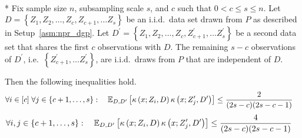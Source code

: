 \begin{lem}[]\label{lem:expec_kernel_prod_bound}\mbox{}\\*
    Fix sample size $n$, subsampling scale $s$, and $c$ such that $0 < c \leq s \leq n$.
	Let $D = \left\{Z_1, Z_2, \dotsc, Z_c, Z_{c+1}, \dotsc Z_s \right\}$ be an i.i.d.\ data set drawn from $P$ as described in Setup~\ref{asm:npr_dgp}.
	Let $D^{\prime} = \left\{Z_1, Z_2, \dotsc, Z_c, Z_{c+1}^{\prime}, \dotsc Z_s^{\prime} \right\}$ be a second data set that shares the first $c$ observations with $D$.
	The remaining $s - c$ observations of $D^{\prime}$, i.e.\ $\left\{Z_{c+1}^{\prime}, \dotsc Z_s^{\prime} \right\}$, are i.i.d.\ draws from $P$ that are independent of $D$.

    Then the following inequalities hold.
    \begin{equation}
        \begin{aligned}
            \forall i \in [c] \; \forall j \in \{c+1, \dotsc, s\}: \quad
            \mathbb{E}_{D, D^{\prime}}\left[\kappa\left(x; Z_{i}, D\right)\kappa\left(x; Z_{j}^{\prime}, D^{\prime}\right)\right]
            & \leq \frac{2}{(2s - c)(2s-c-1)}
        \end{aligned}
    \end{equation}
    \begin{equation}
        \begin{aligned}
            \forall i,j \in \{c+1, \dotsc, s\}: \quad
            \mathbb{E}_{D, D^{\prime}}\left[\kappa\left(x; Z_{i}, D\right)\kappa\left(x; Z_{j}^{\prime}, D^{\prime}\right)\right]
            & \leq \frac{4}{(2s-c)(2s-c-1)}
        \end{aligned}
    \end{equation}
\end{lem}

